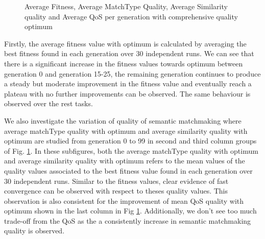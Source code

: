 \documentclass{IEEEtran}
\begin{document}
\begin{figure}[h]
 \caption{Average Fitness, Average MatchType Quality, Average Similarity quality and Average QoS per generation with comprehensive quality optimum}
 \label{exp_fitnessvalue}
\end{figure}
Firstly, the average fitness value with optimum is calculated by averaging the best fitness found in each generation over 30 independent runs. We can see that there is a significant increase in the fitness values towards optimum between generation 0 and generation 15-25, the remaining generation continues to produce a steady but moderate improvement in the fitness value and eventually reach a plateau with no further improvements can be observed. The same behaviour is observed over the rest tasks.

We also investigate the variation of quality of semantic matchmaking where average matchType quality with optimum and average similarity quality with optimum are studied from generation 0 to 99 in second and third column groups of Fig. \ref{exp_fitnessvalue}. In these subfigures, both the average matchType quality with optimum and average similarity quality with optimum refers to the mean values of the quality values associated to the best fitness value found in each generation over 30 independent runs. Similar to the fitness values, clear evidence of fast convergence can be observed with respect to theses quality values. This observation is also consistent for the improvement of mean QoS quality with optimum shown in the last column in Fig \ref{exp_fitnessvalue}. Additionally, we don't see too much trade-off from the QoS as the a consistently increase in semantic matchmaking quality is observed.
\end{document}
